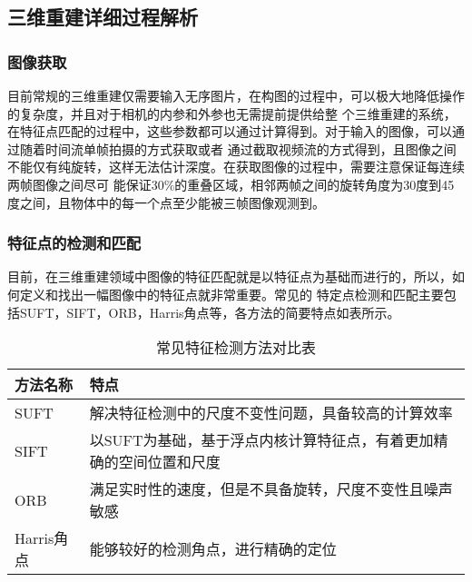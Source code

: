 \subsection{三维重建详细过程解析}
\label{sec:3.2.2}
\subsubsection{图像获取} 
\label{sec:3.2.2.1}
目前常规的三维重建仅需要输入无序图片，在构图的过程中，可以极大地降低操作的复杂度，并且对于相机的内参和外参也无需提前提供给整
个三维重建的系统，在特征点匹配的过程中，这些参数都可以通过计算得到。对于输入的图像，可以通过随着时间流单帧拍摄的方式获取或者
通过截取视频流的方式得到，且图像之间不能仅有纯旋转，这样无法估计深度。在获取图像的过程中，需要注意保证每连续两帧图像之间尽可
能保证30$\%$的重叠区域，相邻两帧之间的旋转角度为30度到45度之间，且物体中的每一个点至少能被三帧图像观测到。
\subsubsection{特征点的检测和匹配} 
\label{sec:3.2.2.2}
目前，在三维重建领域中图像的特征匹配就是以特征点为基础而进行的，所以，如何定义和找出一幅图像中的特征点就非常重要。常见的
特定点检测和匹配主要包括SUFT，SIFT，ORB，Harris角点等，各方法的简要特点如表所示。
\begin{table}[h]
    \centering
    \caption{常见特征检测方法对比表}
    \label{tab:Feature}
    \begin{tabular}{C{4.6cm}L{8.4cm}}
    \toprule
    \textbf{方法名称} & \textbf{特点}  \\
    \midrule
    SUFT&解决特征检测中的尺度不变性问题，具备较高的计算效率\\
    SIFT&以SUFT为基础，基于浮点内核计算特征点，有着更加精确的空间位置和尺度\\
    ORB&满足实时性的速度，但是不具备旋转，尺度不变性且噪声敏感\\
    Harris角点&能够较好的检测角点，进行精确的定位\\
    \bottomrule
    \end{tabular}
  \end{table}

